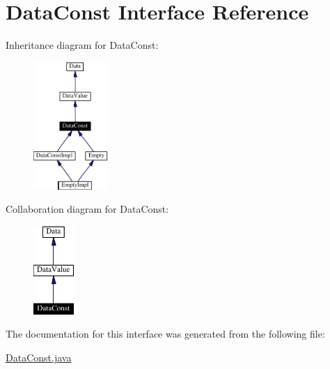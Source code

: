 \hypertarget{interfaceDataConst}{
\section{Data\-Const  Interface Reference}
\label{interfaceDataConst}
}
Inheritance diagram for Data\-Const:\begin{figure}[H]
\begin{center}
\leavevmode
\includegraphics[width=80pt]{interfaceDataConst__inherit__graph}
\end{center}
\end{figure}
Collaboration diagram for Data\-Const:\begin{figure}[H]
\begin{center}
\leavevmode
\includegraphics[width=44pt]{interfaceDataConst__coll__graph}
\end{center}
\end{figure}


The documentation for this interface was generated from the following file:\begin{CompactItemize}
\item 
\hyperlink{DataConst_8java-source}{Data\-Const.java}\end{CompactItemize}
